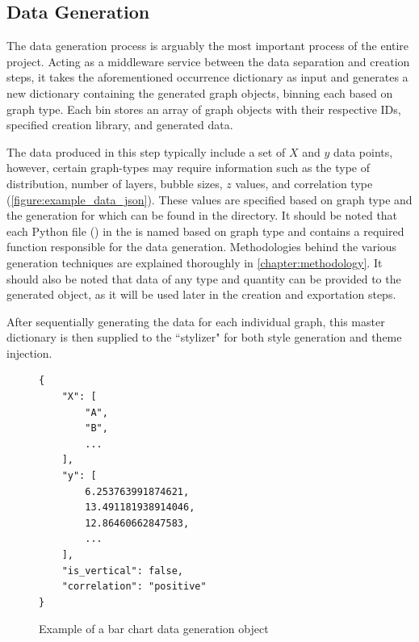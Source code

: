 \subsection{Data Generation}
\label{subsection:data_generation}
The data generation process is arguably the most important process of the entire project. Acting as a middleware service between the data separation and creation steps, it takes the aforementioned occurrence dictionary as input and generates a new dictionary containing the generated graph objects, binning each based on graph type. Each bin stores an array of graph objects with their respective IDs, specified creation library, and generated data. 

\hfill

The data produced in this step typically include a set of \(X\) and \(y\) data points, however, certain graph-types may require information such as the type of distribution, number of layers, bubble sizes, \(z\) values, and correlation type (\autoref{figure:example_data_json}). These values are specified based on graph type and the generation for which can be found in the  directory. It should be noted that each Python file () in the  is named based on graph type and contains a required  function responsible for the data generation. Methodologies behind the various generation techniques are explained thoroughly in \autoref{chapter:methodology}. It should also be noted that data of any type and quantity can be provided to the generated object, as it will be used later in the creation and exportation steps.

\hfill

After sequentially generating the data for each individual graph, this master dictionary is then supplied to the ``stylizer" for both style generation and theme injection.

\begin{figure}
    \begin{verbatim}
{
    "X": [
        "A",
        "B",
        ...
    ],
    "y": [
        6.253763991874621,
        13.491181938914046,
        12.86460662847583,
        ...
    ],
    "is_vertical": false,
    "correlation": "positive"
}
    \end{verbatim}
    \caption{Example of a bar chart data generation object} 
    \label{figure:example_data_json}
\end{figure}

